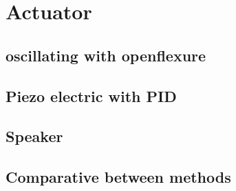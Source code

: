 \chapter{Actuator}

\section{oscillating with openflexure}

\section{Piezo electric with PID}

\section{Speaker}

\section{Comparative between methods}